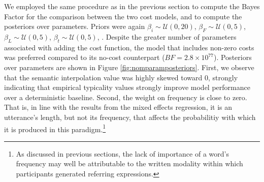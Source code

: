 \documentclass[11pt]{article}
\newcommand{\jd}[1]{\textcolor{Red}{[jd: #1]}}
\newcommand{\ndg}[1]{\textcolor{Green}{[ndg: #1]}}
\newcommand{\figref}[1]{Figure \ref{#1}}
\begin{document}
We employed the same procedure as in the previous section to compute the Bayes Factor for the comparison between the two cost models, and to compute the posteriors over parameters. Priors were again  $\beta_i  \sim \mathcal{U}(0,20)$,  $\beta_{F} \sim \mathcal{U}(0,5)$, $\beta_{L} \sim \mathcal{U}(0,5)$, $\beta_t  \sim \mathcal{U}(0,5)$, .
Despite the greater number of parameters associated with adding the cost function, the  model that includes non-zero costs was preferred compared to its no-cost counterpart ($BF = 2.8 \times 10^{77}$). 
Posteriors over parameters are shown in \figref{fig:nomparamposteriors}. 
First, we observe that the semantic interpolation value was highly skewed toward 0, strongly indicating that empirical typicality values strongly improve model performance over a deterministic baseline. 
Second, the weight on frequency is close to zero. That is, in line with the results from the mixed effects regression, it is an utterance's length, but not its frequency, that affects the probabilitiy with which it is produced in this paradigm.\footnote{As discussed in previous sections, the lack of importance of a word's frequency may well be attributable to the written modality within which participants generated referring expressions.} 
\end{document}
